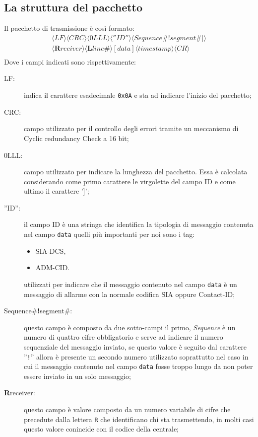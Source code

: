 \subsection{La struttura del pacchetto}
Il pacchetto di trasmissione è così formato:
$$
\begin{array}{c}
\langle LF\rangle\langle CRC\rangle\langle 0LLL\rangle\langle ''ID''\rangle\langle Sequence\#\textbf{!}segment\#|\rangle\\\langle\textbf{R}reciver\rangle\langle\textbf{L}line\#\rangle
{[data]}\langle timestamp\rangle \langle CR\rangle\\
\end{array}	 
$$
Dove i campi indicati sono rispettivamente:
\begin{description}
	\item[LF:] indica il carattere esadecimale \texttt{0x0A} e sta ad indicare l'inizio del pacchetto;
	\item[CRC:] campo utilizzato per il controllo degli errori tramite un meccanismo di Cyclic redundancy Check a 16 bit;
	\item[0LLL:] campo utilizzato per indicare la lunghezza del pacchetto. Essa è calcolata considerando come primo carattere le virgolette del campo ID e come ultimo il carattere '$ ] $';
	\item[''ID'':] il campo ID è una stringa che identifica la tipologia di messaggio contenuta nel campo \texttt{data} quelli più importanti per noi sono i tag:
	\begin{itemize}
		\item SIA-DCS,
		\item ADM-CID.
	\end{itemize}
	utilizzati per indicare che il messaggio contenuto nel campo \texttt{data} è un messaggio di allarme con la normale codifica SIA oppure Contact-ID;
	\item[Sequence\#\textbf{!}segment\#:] questo campo è composto da due sotto-campi il primo, \emph{Sequence} è un numero di quattro cifre obbligatorio e serve ad indicare il numero sequenziale del messaggio inviato, se questo valore è seguito dal carattere ''\texttt{!}'' allora è presente un secondo numero utilizzato soprattutto nel caso in cui il messaggio contenuto nel campo \texttt{data} fosse troppo lungo da non poter essere inviato in un solo messaggio;
	\item[\textbf{R}receiver:] questo campo è valore composto da un numero variabile di cifre che precedute dalla lettera \texttt{R} che identificano chi sta trasmettendo, in molti casi questo valore conincide con il codice della centrale;

\end{description}
